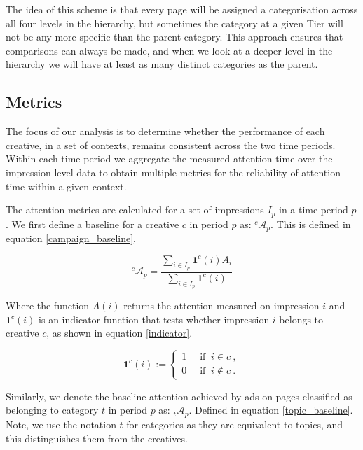 \documentclass[sigconf]{acmart}
\begin{document}
The idea of this scheme is that every page will be assigned a categorisation across
all four levels in the hierarchy, but sometimes the category at a given Tier
will not be any more specific than the parent category. This approach ensures
that comparisons can always be made, and when we look at a deeper level in the hierarchy
we will have at least as many distinct categories as the parent.

\subsection{Metrics}

The focus of our analysis is to determine whether the performance of each creative,
in a set of contexts, remains consistent across the two time periods.
Within each time period we aggregate
the measured attention time over the impression level data to obtain multiple metrics
for the reliability of attention time within a given context.


The attention metrics are calculated for a set of impressions $I_p$ in a time period $p$.
We first define a baseline for a creative $c$ in period $p$ as:
${}^c\mathcal{A}_p$. This is defined in equation \ref{campaign_baseline}.

\begin{equation}
\label{campaign_baseline}
{}^c\mathcal{A}_p =  \frac{ \sum_{i \in I_p} \mathbf{1}^c(i) A_i }{ \sum_{i \in I_p} \mathbf{1}^c(i) }
\end{equation}

Where the function $A(i)$ returns the attention measured on impression $i$ and
$\mathbf{1}^c(i)$ is an indicator function that
tests whether impression $i$ belongs to creative $c$, as shown in equation \ref{indicator}.

\begin{equation}
\label{indicator}
  \mathbf{1}^{c}(i):=
  \begin{cases}1~&{\text{ if }}~i\in c~,\\0~&{\text{ if }}~i\notin c~.\end{cases}
\end{equation}

Similarly, we denote the baseline attention achieved by ads on pages classified
as belonging to category $t$ in period $p$ as: ${}_t\mathcal{A}_p$. Defined in
equation \ref{topic_baseline}. Note, we use the notation $t$ for categories as they
are equivalent to topics, and this distinguishes them from the creatives.
\end{document}
